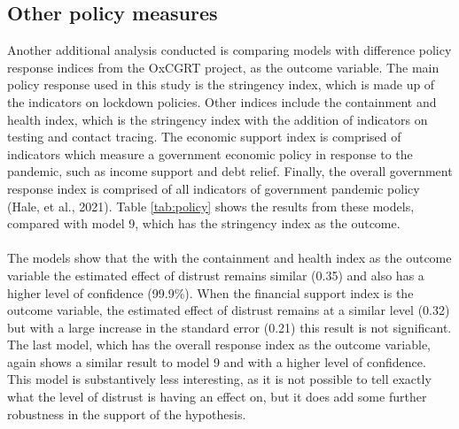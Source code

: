\documentclass[
  11pt,
]{article}
\begin{document}
\hypertarget{other-policy-measures}{%
\subsection{Other policy measures}\label{other-policy-measures}}

Another additional analysis conducted is comparing models with difference policy response indices from the OxCGRT project, as the outcome variable. The main policy response used in this study is the stringency index, which is made up of the indicators on lockdown policies. Other indices include the containment and health index, which is the stringency index with the addition of indicators on testing and contact tracing. The economic support index is comprised of indicators which measure a government economic policy in response to the pandemic, such as income support and debt relief. Finally, the overall government response index is comprised of all indicators of government pandemic policy (Hale, et al., 2021). Table \ref{tab:policy} shows the results from these models, compared with model 9, which has the stringency index as the outcome.\\
~\\
The models show that the with the containment and health index as the outcome variable the estimated effect of distrust remains similar (0.35) and also has a higher level of confidence (99.9\%). When the financial support index is the outcome variable, the estimated effect of distrust remains at a similar level (0.32) but with a large increase in the standard error (0.21) this result is not significant. The last model, which has the overall response index as the outcome variable, again shows a similar result to model 9 and with a higher level of confidence. This model is substantively less interesting, as it is not possible to tell exactly what the level of distrust is having an effect on, but it does add some further robustness in the support of the hypothesis.\\
\end{document}
